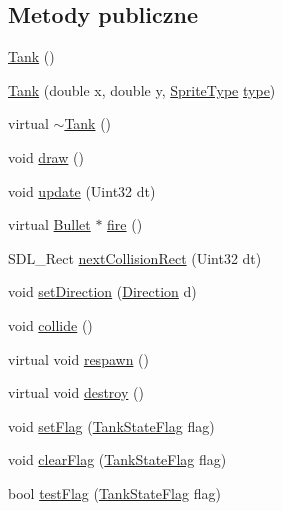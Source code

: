 \subsection*{Metody publiczne}
\begin{DoxyCompactItemize}
\item 
\hyperlink{class_tank_ae8be1e2c9376c3a4590b4bf689eaed76}{Tank} ()
\item 
\hyperlink{class_tank_ab6b6a6d0ec3994fa12f4933602dd4325}{Tank} (double x, double y, \hyperlink{type_8h_ac6fa10729dffeb6a192492f13c25e31a}{Sprite\+Type} \hyperlink{class_object_a1b89f32cd9e0040f8a2455f3cef7d0d2}{type})
\item 
virtual \hyperlink{class_tank_a9e4fce49ae7fe871894c1a3122c10269}{$\sim$\+Tank} ()
\item 
void \hyperlink{class_tank_ab30c54bb7378b522fa965d4e8ab7ed4f}{draw} ()
\item 
void \hyperlink{class_tank_a1278dfec0f2d1d3bb1f4ce0a19957c0f}{update} (Uint32 dt)
\item 
virtual \hyperlink{class_bullet}{Bullet} $\ast$ \hyperlink{class_tank_ae5c683a77507d638b2e2d7526e5205de}{fire} ()
\item 
S\+D\+L\+\_\+\+Rect \hyperlink{class_tank_a2373592e898ce038e22ed59f4486ba6d}{next\+Collision\+Rect} (Uint32 dt)
\item 
void \hyperlink{class_tank_a649b24d19a48a3e93f4ba14821338f46}{set\+Direction} (\hyperlink{type_8h_a224b9163917ac32fc95a60d8c1eec3aa}{Direction} d)
\item 
void \hyperlink{class_tank_a4d254f913ab43a6bc62494a8ab1444cd}{collide} ()
\item 
virtual void \hyperlink{class_tank_a61501e1b99fd235500b79f39c6b2fc8f}{respawn} ()
\item 
virtual void \hyperlink{class_tank_a5d2e3302417166ccdc42b8bc2e5d5dc4}{destroy} ()
\item 
void \hyperlink{class_tank_a4c624b0a64ca72567a758d17b3350873}{set\+Flag} (\hyperlink{type_8h_a4cfefb8efe4714111e829031e2df4faf}{Tank\+State\+Flag} flag)
\item 
void \hyperlink{class_tank_ac8525d73bc6bd199ca51bb447f342925}{clear\+Flag} (\hyperlink{type_8h_a4cfefb8efe4714111e829031e2df4faf}{Tank\+State\+Flag} flag)
\item 
bool \hyperlink{class_tank_ab9d5c0e134f6be71b7bc245268e90a01}{test\+Flag} (\hyperlink{type_8h_a4cfefb8efe4714111e829031e2df4faf}{Tank\+State\+Flag} flag)
\end{DoxyCompactItemize}
